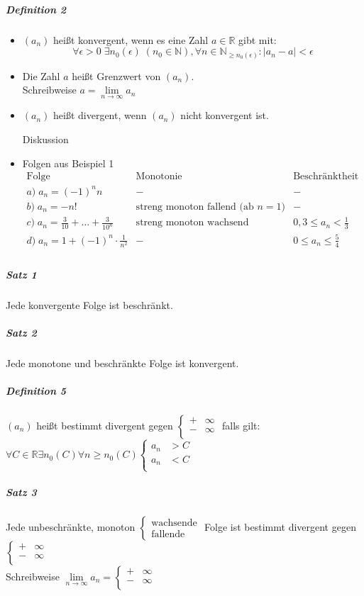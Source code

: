 \documentclass[a4paper]{scrartcl}
\begin{document}
\subparagraph{Definition 2}
\begin{itemize}
\item $(a_n)$ heißt konvergent, wenn es eine Zahl $a \in \mathbb{R}$ gibt mit:
\[\forall \epsilon >0 \; \exists n_0(\epsilon)\; (n_0 \in \mathbb{N}), \forall n \in \mathbb{N}_{\geq n_0(\epsilon)}: \lvert a_n - a \rvert < \epsilon\]
\item Die Zahl $a$ heißt Grenzwert von $(a_n)$.\\
Schreibweise $a= \lim\limits_{n \to \infty} a_n$
\item $(a_n)$ heißt divergent, wenn $(a_n)$ nicht konvergent ist.

Diskussion 
\item Folgen aus Beispiel 1\\
$\begin{array}{l|c|r}
\text{Folge} & \text{Monotonie} & \text{Beschränktheit}\\ \hline
a) \; a_n = (-1)^n n & - & - \\
b) \; a_n = -n! & \text{streng monoton fallend (ab } n=1) & -\\
c)\; a_n = \frac{3}{10} + \dots + \frac{3}{10^n} & \text{streng monoton wachsend} & 0,3 \leq a_n < \frac{1}{3} \\
d)\; a_n = 1 + (-1)^n \cdot \frac{1}{n^2} & - & 0 \leq a_n \leq \frac{5}{4}\\

\end{array}$
\end{itemize}

\subparagraph{Satz 1} Jede konvergente Folge ist beschränkt.
\subparagraph{Satz 2} Jede monotone und beschränkte Folge ist konvergent.

\subparagraph{Definition 5} $(a_n)$ heißt bestimmt divergent gegen $\left\{ \begin{array}{rc}
         +
         & \infty \\ 
        -
         & \infty\\
                \end{array}\right.$
falls gilt: $\forall C \in \mathbb{R} \exists n_0 (C) \forall n \geq n_0 (C) \left\{ \begin{array}{lc} a_n & > C \\ a_n & <C\\ \end{array} \right. $
\subparagraph{Satz 3} Jede unbeschränkte, monoton $\left\{ \begin{array}{l} \mbox{wachsende} \\ \mbox{fallende} \end{array} \right.$ Folge ist bestimmt divergent gegen $\left\{ \begin{array}{rc}
         + & \infty \\ 
        - & \infty\\
\end{array}\right.$\\
Schreibweise $\lim\limits_{n \to \infty} a_n = \left\{ \begin{array}{rc}
         + & \infty \\ 
        - & \infty\\
\end{array}\right.$
\end{document}
